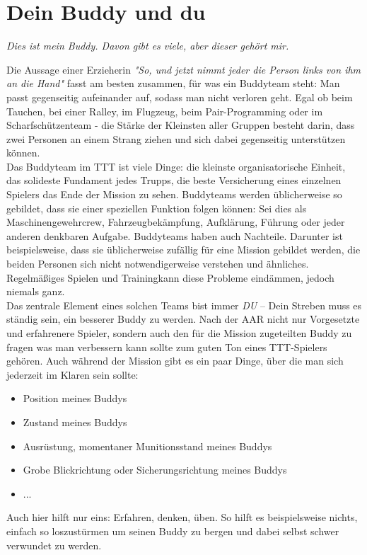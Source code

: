 \newpage
\section{Dein Buddy und du}
\centerline{\textit{Dies ist mein Buddy. Davon gibt es viele, aber dieser gehört mir.}}
	Die Aussage einer Erzieherin \textit{"So, und jetzt nimmt jeder die Person links von ihm an die Hand"} fasst am besten zusammen, für was ein Buddyteam steht: Man passt gegenseitig aufeinander auf, sodass man nicht verloren geht. Egal ob beim Tauchen, bei einer Ralley, im Flugzeug, beim Pair-Programming oder im Scharfschützenteam - die Stärke der Kleinsten aller Gruppen besteht darin, dass zwei Personen an einem Strang ziehen und sich dabei gegenseitig unterstützen können. \\
	Das Buddyteam im \ac{TTT} ist viele Dinge: die kleinste organisatorische Einheit, das solideste Fundament jedes Trupps, die beste Versicherung eines einzelnen Spielers das Ende der Mission zu sehen. Buddyteams werden üblicherweise so gebildet, dass sie einer speziellen Funktion folgen können: Sei dies als Maschinengewehrcrew, Fahrzeugbekämpfung, Aufklärung, Führung oder jeder anderen denkbaren Aufgabe. Buddyteams haben auch Nachteile. Darunter ist beispielsweise, dass sie üblicherweise zufällig für eine Mission gebildet werden, die beiden Personen sich nicht notwendigerweise verstehen und ähnliches. Regelmäßiges Spielen und Trainingkann diese Probleme eindämmen, jedoch niemals ganz. \\
	Das zentrale Element eines solchen Teams bist immer \textit{DU} -- Dein Streben muss es ständig sein, ein besserer Buddy zu werden. Nach der AAR nicht nur Vorgesetzte und erfahrenere Spieler, sondern auch den für die Mission zugeteilten Buddy zu fragen was man verbessern kann sollte zum guten Ton eines \ac{TTT}-Spielers gehören. Auch während der Mission gibt es ein paar Dinge, über die man sich jederzeit im Klaren sein sollte:
		\begin{itemize}
			\item Position meines Buddys
			\item Zustand meines Buddys
			\item Ausrüstung, momentaner Munitionsstand meines Buddys
			\item Grobe Blickrichtung oder Sicherungsrichtung meines Buddys
			\item ...
		\end{itemize}
	Auch hier hilft nur eins: Erfahren, denken, üben. So hilft es beispielsweise nichts, einfach so loszustürmen um seinen Buddy zu bergen und dabei selbst schwer verwundet zu werden. 